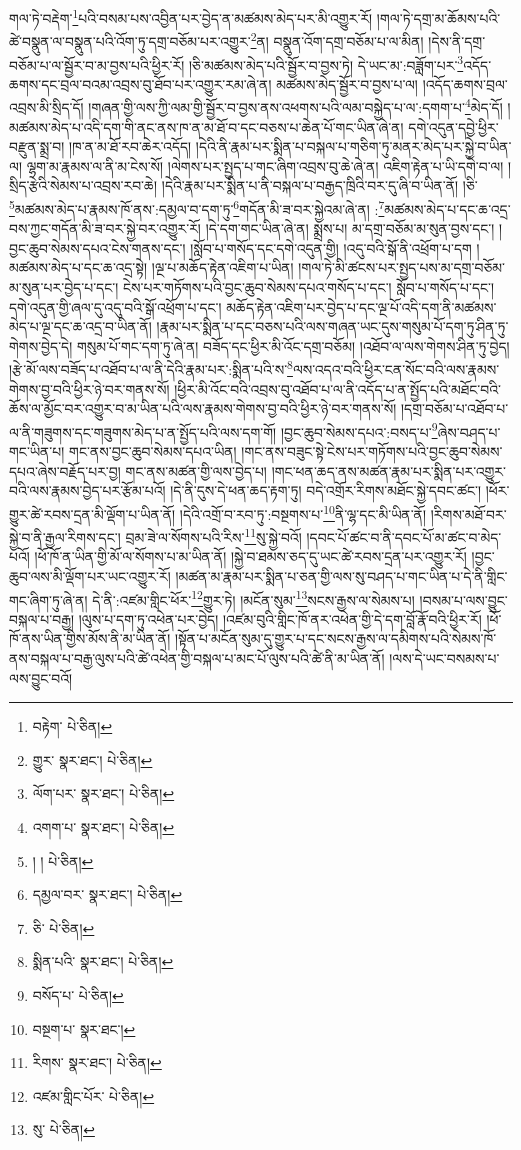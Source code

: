 གལ་ཏེ་བརྡེག་\footnote{བརྟེག་  པེ་ཅིན། }པའི་བསམ་པས་འབྱིན་པར་བྱེད་ན་མཚམས་མེད་པར་མི་འགྱུར་རོ། །གལ་ཏེ་དགྲ་མ་ཆོམས་པའི་ཚེ་བསྣུན་ལ་བསྣུན་པའི་འོག་ཏུ་དགྲ་བཅོམ་པར་འགྱུར་\footnote{གྱུར་  སྣར་ཐང་།  པེ་ཅིན། }ན། བསྣུན་འོག་དགྲ་བཅོམ་པ་ལ་མིན། །དེས་ནི་དགྲ་བཅོམ་པ་ལ་སྦྱོར་བ་མ་བྱས་པའི་ཕྱིར་རོ། །ཅི་མཚམས་མེད་པའི་སྦྱོར་བ་བྱས་ཏེ། དེ་ཡང་མ་:བཟློག་པར་\footnote{ལོག་པར་  སྣར་ཐང་།  པེ་ཅིན། }འདོད་ཆགས་དང་བྲལ་བའམ་འབྲས་བུ་ཐོབ་པར་འགྱུར་རམ་ཞེ་ན། མཚམས་མེད་སྦྱོར་བ་བྱས་པ་ལ། །འདོད་ཆགས་བྲལ་འབྲས་མི་སྲིད་དོ། །གཞན་གྱི་ལས་ཀྱི་ལམ་གྱི་སྦྱོར་བ་བྱས་ནས་འཕགས་པའི་ལམ་བསྐྱེད་པ་ལ་:དགག་པ་\footnote{འགག་པ་  སྣར་ཐང་།  པེ་ཅིན། }མེད་དོ། །མཚམས་མེད་པ་འདི་དག་གི་ནང་ནས་ཁ་ན་མ་ཐོ་བ་དང་བཅས་པ་ཆེན་པོ་གང་ཡིན་ཞེ་ན། དགེ་འདུན་དབྱེ་ཕྱིར་བརྫུན་སྨྲ་བ། །ཁ་ན་མ་ཐོ་རབ་ཆེར་འདོད། །དེའི་ནི་རྣམ་པར་སྨིན་པ་བསྐལ་པ་གཅིག་ཏུ་མནར་མེད་པར་སྐྱེ་བ་ཡིན་ལ། ལྷག་མ་རྣམས་ལ་ནི་མ་ངེས་སོ། །ལེགས་པར་སྤྱད་པ་གང་ཞིག་འབྲས་བུ་ཆེ་ཞེ་ན། འཇིག་རྟེན་པ་ཡི་དགེ་བ་ལ། །སྲིད་རྩེའི་སེམས་པ་འབྲས་རབ་ཆེ། །དེའི་རྣམ་པར་སྨིན་པ་ནི་བསྐལ་པ་བརྒྱད་ཁྲིའི་བར་དུ་ཞི་བ་ཡིན་ནོ། །ཅི་\footnote{། །  པེ་ཅིན། }མཚམས་མེད་པ་རྣམས་ཁོ་ནས་:དམྱལ་བ་དག་ཏུ་\footnote{དམྱལ་བར་  སྣར་ཐང་།  པེ་ཅིན། }གདོན་མི་ཟ་བར་སྐྱེའམ་ཞེ་ན། :\footnote{ཅི་  པེ་ཅིན། }མཚམས་མེད་པ་དང་ཆ་འདྲ་བས་ཀྱང་གདོན་མི་ཟ་བར་སྐྱེ་བར་འགྱུར་རོ། །དེ་དག་གང་ཡིན་ཞེ་ན། སྨྲས་པ། མ་དགྲ་བཅོམ་མ་སུན་བྱས་དང་། །བྱང་ཆུབ་སེམས་དཔའ་ངེས་གནས་དང་། །སློབ་པ་གསོད་དང་དགེ་འདུན་གྱི། །འདུ་བའི་སྒོ་ནི་འཕྲོག་པ་དག །མཚམས་མེད་པ་དང་ཆ་འདྲ་སྟེ། །ལྔ་པ་མཆོད་རྟེན་འཇིག་པ་ཡིན། །གལ་ཏེ་མི་ཚངས་པར་སྤྱད་པས་མ་དགྲ་བཅོམ་མ་སུན་པར་བྱེད་པ་དང་། ངེས་པར་གཏོགས་པའི་བྱང་ཆུབ་སེམས་དཔའ་གསོད་པ་དང་། སློབ་པ་གསོད་པ་དང་། དགེ་འདུན་གྱི་ཞལ་དུ་འདུ་བའི་སྒོ་འཕྲོག་པ་དང་། མཆོད་རྟེན་འཇིག་པར་བྱེད་པ་དང་ལྔ་པོ་འདི་དག་ནི་མཚམས་མེད་པ་ལྔ་དང་ཆ་འདྲ་བ་ཡིན་ནོ། །རྣམ་པར་སྨིན་པ་དང་བཅས་པའི་ལས་གཞན་ཡང་དུས་གསུམ་པོ་དག་ཏུ་ཤིན་ཏུ་གེགས་བྱེད་དེ། གསུམ་པོ་གང་དག་ཏུ་ཞེ་ན། བཟོད་དང་ཕྱིར་མི་འོང་དགྲ་བཅོམ། །འཐོབ་ལ་ལས་གེགས་ཤིན་ཏུ་བྱེད། །རྩེ་མོ་ལས་བཟོད་པ་འཐོབ་པ་ལ་ནི་དེའི་རྣམ་པར་:སྨིན་པའི་ས་\footnote{སྨིན་པའི་  སྣར་ཐང་།  པེ་ཅིན། }ལས་འདའ་བའི་ཕྱིར་ངན་སོང་བའི་ལས་རྣམས་གེགས་བྱ་བའི་ཕྱིར་ཉེ་བར་གནས་སོ། །ཕྱིར་མི་འོང་བའི་འབྲས་བུ་འཐོབ་པ་ལ་ནི་འདོད་པ་ན་སྤྱོད་པའི་མཐོང་བའི་ཆོས་ལ་མྱོང་བར་འགྱུར་བ་མ་ཡིན་པའི་ལས་རྣམས་གེགས་བྱ་བའི་ཕྱིར་ཉེ་བར་གནས་སོ། །དགྲ་བཅོམ་པ་འཐོབ་པ་ལ་ནི་གཟུགས་དང་གཟུགས་མེད་པ་ན་སྤྱོད་པའི་ལས་དག་གོ། །བྱང་ཆུབ་སེམས་དཔའ་:བསད་པ་\footnote{བསོད་པ་  པེ་ཅིན། }ཞེས་བཤད་པ་གང་ཡིན་པ། གང་ནས་བྱང་ཆུབ་སེམས་དཔའ་ཡིན། །གང་ནས་བཟུང་སྟེ་ངེས་པར་གཏོགས་པའི་བྱང་ཆུབ་སེམས་དཔའ་ཞེས་བརྗོད་པར་བྱ། གང་ནས་མཚན་གྱི་ལས་བྱེད་པ། །གང་ཕན་ཆད་ནས་མཚན་རྣམ་པར་སྨིན་པར་འགྱུར་བའི་ལས་རྣམས་བྱེད་པར་རྩོམ་པའོ། །དེ་ནི་དུས་དེ་ཕན་ཆད་རྟག་ཏུ། བདེ་འགྲོར་རིགས་མཐོང་སྐྱེ་དབང་ཚང་། །ཕོར་གྱུར་ཚེ་རབས་དྲན་མི་ལྡོག་པ་ཡིན་ནོ། །དེའི་འགྲོ་བ་རབ་ཏུ་:བསྔགས་པ་\footnote{བསྔག་པ་  སྣར་ཐང་། }ནི་ལྷ་དང་མི་ཡིན་ནོ། །རིགས་མཐོ་བར་སྐྱེ་བ་ནི་རྒྱལ་རིགས་དང་། བྲམ་ཟེ་ལ་སོགས་པའི་རིས་\footnote{རིགས་  སྣར་ཐང་།  པེ་ཅིན། }སུ་སྐྱེ་བའོ། །དབང་པོ་ཚང་བ་ནི་དབང་པོ་མ་ཚང་བ་མེད་པའོ། །ཕོ་ཁོ་ན་ཡིན་གྱི་མོ་ལ་སོགས་པ་མ་ཡིན་ནོ། །སྐྱེ་བ་ཐམས་ཅད་དུ་ཡང་ཚེ་རབས་དྲན་པར་འགྱུར་རོ། །བྱང་ཆུབ་ལས་མི་ལྡོག་པར་ཡང་འགྱུར་རོ། །མཚན་མ་རྣམ་པར་སྨིན་པ་ཅན་གྱི་ལས་སུ་བཤད་པ་གང་ཡིན་པ་དེ་ནི་གླིང་གང་ཞིག་ཏུ་ཞེ་ན། དེ་ནི་:འཛམ་གླིང་ཕོར་\footnote{འཛམ་གླིང་པོར་  པེ་ཅིན། }གྱུར་ཏེ། །མངོན་སུམ་\footnote{སུ་  པེ་ཅིན། }སངས་རྒྱས་ལ་སེམས་པ། །བསམ་པ་ལས་བྱུང་བསྐལ་པ་བརྒྱ། །ལུས་པ་དག་ཏུ་འཕེན་པར་བྱེད། །འཛམ་བུའི་གླིང་ཁོ་ནར་འཕེན་གྱི་དེ་དག་བློ་རྣོ་བའི་ཕྱིར་རོ། །ཕོ་ཁོ་ནས་ཡིན་གྱིས་མོས་ནི་མ་ཡིན་ནོ། །སྟོན་པ་མངོན་སུམ་དུ་གྱུར་པ་དང་སངས་རྒྱས་ལ་དམིགས་པའི་སེམས་ཁོ་ནས་བསྐལ་པ་བརྒྱ་ལུས་པའི་ཚེ་འཕེན་གྱི་བསྐལ་པ་མང་པོ་ལུས་པའི་ཚེ་ནི་མ་ཡིན་ནོ། །ལས་དེ་ཡང་བསམས་པ་ལས་བྱུང་བའོ། 